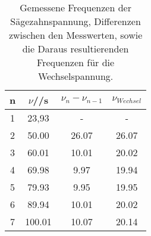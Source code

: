 \begin{table}[H]
  \centering
   \begin{tabular}{c c c c}
    \toprule
     n& $\nu$/\; 1/s & $\nu_{n} - \nu_{n-1}$ & $\nu_{Wechsel}$\\
    \midrule
    1 & 23,93 & - & -\\
    2 & 50.00 & 26.07 & 26.07\\
    3 & 60.01 & 10.01 & 20.02\\
    4 & 69.98 & 9.97 & 19.94\\
    5 & 79.93 & 9.95 & 19.95\\
    6 & 89.94 & 10.01 & 20.02\\
    7 & 100.01 & 10.07 & 20.14\\
    \bottomrule
  \end{tabular}
  \caption{Gemessene Frequenzen der Sägezahnspannung, Differenzen zwischen
  den Messwerten, sowie die Daraus resultierenden Frequenzen für die
  Wechselspannung.}
  \label{tab:tab3}
\end{table}
